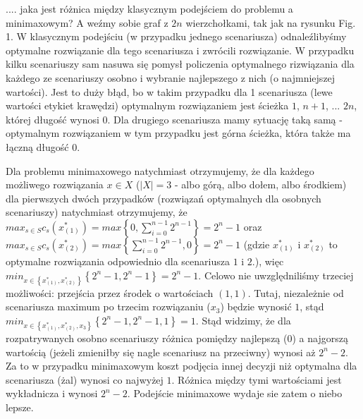 .... jaka jest różnica między klasycznym podejściem do problemu a minimaxowym? A weźmy sobie graf z $2n$ wierzchołkami, tak jak na rysunku Fig. 1. W klasycznym podejściu (w przypadku jednego scenariusza) odnaleźlibyśmy optymalne rozwiązanie dla tego scenariusza i zwrócili rozwiązanie. W przypadku kilku scenariuszy sam nasuwa się pomysł policzenia optymalnego rizwiązania dla każdego ze scenariuszy osobno i wybranie najlepszego z nich (o najmniejszej wartości). Jest to duży błąd, bo w takim przypadku dla 1 scenariusza (lewe wartości etykiet krawędzi) optymalnym rozwiązaniem jest ścieżka $1$, $n+1$, ... $2n$, której długość wynosi $0$. Dla drugiego scenariusza mamy sytuację taką samą - optymalnym rozwiązaniem w tym przypadku jest górna ścieżka, która także ma łączną długość $0$.

Dla problemu minimaxowego natychmiast otrzymujemy, że dla każdego możliwego rozwiązania $x \in X$ ($|X| = 3$ - albo górą, albo dołem, albo środkiem) dla pierwszych dwóch przypadków (rozwiązań optymalnych dla osobnych scenariuszy) natychmiast otrzymujemy, że $max_{s\in S} c_{s} \left( x^{\ast}_{\left( 1 \right)} \right) =  max \left\{ 0, \sum_{i=0}^{n-1} 2^{n-1} \right\} = 2^{n} - 1$ oraz $max_{s\in S} c_{s} \left( x^{\ast}_{{\left( 2 \right)}} \right) =  max \left\{ \sum_{i=0}^{n-1} 2^{n-1}, 0 \right\} = 2^{n} - 1$ (gdzie $x^{\ast}_{\left( 1 \right)}$ i $x^{\ast}_{\left( 2 \right)}$ to optymalne rozwiązania odpowiednio dla scenariusza $1$ i $2$.), więc $min_{x \in \left\{  x^{\ast}_{\left( 1 \right)}, x^{\ast}_{\left( 2 \right)} \right\}} \left\{ 2^{n} - 1, 2^{n} - 1 \right\} = 2^{n} - 1$. Celowo nie uwzględniliśmy trzeciej możliwości: przejścia przez środek o wartościach $\left( 1, 1 \right)$. Tutaj, niezależnie od scenariusza maximum po trzecim rozwiązaniu ($x_3$) będzie wynosić $1$, stąd $min_{x \in \left\{  x^{\ast}_{\left( 1 \right)}, x^{\ast}_{\left( 2 \right)}, x_3 \right\}} \left\{ 2^{n} - 1, 2^{n} - 1, 1 \right\} = 1$. Stąd widzimy, że dla rozpatrywanych osobno scenariuszy różnica pomiędzy najlepszą ($0$) a najgorszą wartością (jeżeli zmieniłby się nagle scenariusz na przeciwny) wynosi aż $2^n - 2$. Za to w przypadku minimaxowym koszt podjęcia innej decyzji niż optymalna dla scenariusza (żal) wynosi co najwyżej $1$. Różnica między tymi wartościami jest wykładnicza i wynosi $2^n - 2$. Podejście minimaxowe wydaje sie zatem o niebo lepsze.

